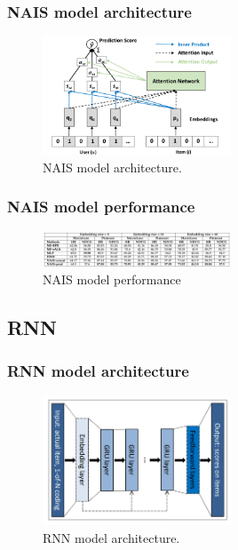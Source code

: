 \documentclass{ieeetj}
\begin{document}
\subsubsection{NAIS model architecture}
\begin{figure}[h]
\centering
\includegraphics[width=0.5\textwidth]{figures/nais-architecture.png}
\caption{NAIS model architecture.}
\label{fig:nais}
\end{figure}

\subsubsection{NAIS model performance}
\begin{figure}[h]
	\centering
	\includegraphics[width=0.5\textwidth]{figures/nais-performance.png}
	\caption{NAIS model performance}
	\label{fig:nais-performance}
\end{figure}

\subsection{RNN}
\subsubsection{RNN model architecture}
\begin{figure}[h]
\centering
\includegraphics[width=0.5\textwidth]{figures/rnn-architecture.png}
\caption{RNN model architecture.}
\label{fig:rnn}
\end{figure}
\end{document}
